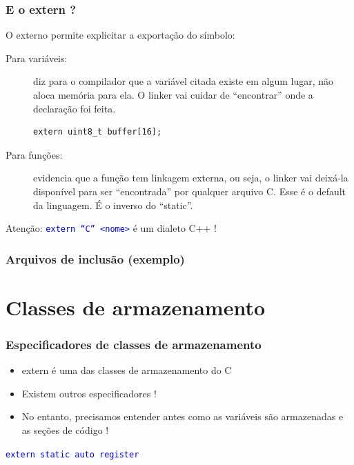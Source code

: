 \documentclass{beamer}
\begin{document}
\begin{frame}[fragile]
	\frametitle{E o extern ?}
	O externo permite explicitar a exportação do símbolo:
	\vspace*{0.5cm}
	\begin{description}
	\item [Para variáveis:] diz para o compilador que a variável citada existe em algum lugar, não aloca memória para ela. O linker vai cuidar de ``encontrar'' onde a declaração foi feita.
	\begin{verbatim}
extern uint8_t buffer[16];
	\end{verbatim}
	\item [Para funções:]	evidencia que a função tem linkagem externa, ou seja, o linker vai deixá-la disponível para ser ``encontrada'' por qualquer arquivo C. Esse é o default da linguagem. É o inverso do ``static''.
	\end{description}
		\vspace*{0.5cm}
		\begin{center}
		Atenção: \texttt{\textcolor{blue}{extern ``C'' <nome>}} é um dialeto C++ !
	\end{center}
\end{frame}

\begin{frame}
	\frametitle{Arquivos de inclusão (exemplo)}
	
\end{frame}

\section{Classes de armazenamento}

\begin{frame}
	\frametitle{Especificadores de classes de armazenamento}
	\begin{itemize}
	\item extern é uma das classes de armazenamento do C
	\item Existem outros especificadores !
	\item No entanto, precisamos entender antes como as variáveis são armazenadas e as seções de código !
	\end{itemize}
	\vspace*{0.5cm}
	\begin{center}
		\texttt{\textcolor{blue}{extern static auto register}}
	\end{center}

\end{frame}
\end{document}
